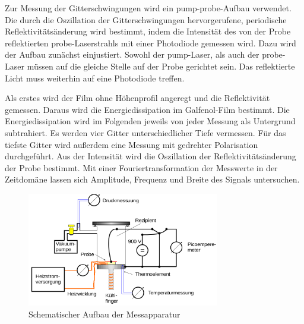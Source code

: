 Zur Messung der Gitterschwingungen wird ein pump-probe-Aufbau verwendet. Die durch die Oszillation der Gitterschwingungen hervorgerufene, periodische Reflektivitätsänderung wird bestimmt, indem die Intensität des von der Probe reflektierten probe-Laserstrahls mit einer Photodiode gemessen wird. Dazu wird der Aufbau zunächst einjustiert. Sowohl der pump-Laser, als auch der probe-Laser müssen auf die gleiche Stelle auf der Probe gerichtet sein. Das reflektierte Licht muss weiterhin auf eine Photodiode treffen.\par
Als erstes wird der Film ohne Höhenprofil angeregt und die Reflektivität gemessen. Daraus wird die Energiedissipation im Galfenol-Film bestimmt. Die Energiedissipation wird im Folgenden jeweils von jeder Messung als Untergrund subtrahiert. Es werden vier Gitter unterschiedlicher Tiefe vermessen. Für das tiefste Gitter wird außerdem eine Messung mit gedrehter Polarisation durchgeführt. Aus der Intensität wird die Oszillation der Reflektivitätsänderung der Probe bestimmt. Mit einer Fouriertransformation der Messwerte in der Zeitdomäne lassen sich Amplitude, Frequenz und Breite des Signals untersuchen.
\begin{figure}
  \centering
  \includegraphics[width=0.75\textwidth]{img/aufbau.png}
  \caption{Schematischer Aufbau der Messapparatur \cite{FP}}
  \label{aufbau}
\end{figure}

\FloatBarrier
